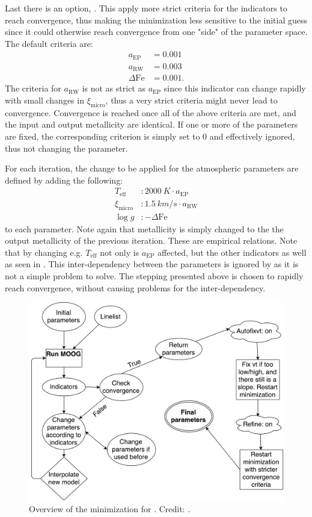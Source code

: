 Last there is an option, . This apply more strict criteria for the indicators to reach
convergence, thus making the minimization less sensitive to the initial guess since it could
otherwise reach convergence from one "side" of the parameter space. The default criteria are:
\begin{align*}
  a_\mathrm{EP}     &= 0.001\\
  a_\mathrm{RW}     &= 0.003\\
  \Delta\mathrm{Fe} &= 0.001.
\end{align*}
The criteria for $a_\mathrm{RW}$ is not as strict as $a_\mathrm{EP}$ since this indicator can change
rapidly with small changes in $\xi_\mathrm{micro}$, thus a very strict criteria might never lead to
convergence. Convergence is reached once all of the above criteria are met, and the input and output
metallicity are identical. If one or more of the parameters are fixed, the corresponding criterion
is simply set to 0 and effectively ignored, thus not changing the parameter.

For each iteration, the change to be applied for the atmospheric parameters are defined by adding
the following:
\begin{align}
  T_\mathrm{eff}     &: \SI{2000}{K} \cdot a_\mathrm{EP}   \\
  \xi_\mathrm{micro} &: \SI{1.5}{km/s} \cdot a_\mathrm{RW} \\
  \log g             &: -\Delta\mathrm{Fe}
\end{align}
to each parameter. Note again that metallicity is simply changed to the the output metallicity of
the previous iteration. These are empirical relations. Note that by changing e.g. $T_\mathrm{eff}$
not only is $a_\mathrm{EP}$ affected, but the other indicators as well as seen in .
This inter-dependency between the parameters is ignored by  as it is not a simple
problem to solve. The stepping presented above is chosen to rapidly reach convergence, without
causing problems for the inter-dependency.

\begin{figure}[htpb!]
    \centering
    \includegraphics[width=0.85\linewidth]{figures/FASMA_minimization.pdf}
    \caption{Overview of the minimization for . Credit: \citet{Andreasen2017a}.}
    \label{fig:minimization}
\end{figure}


